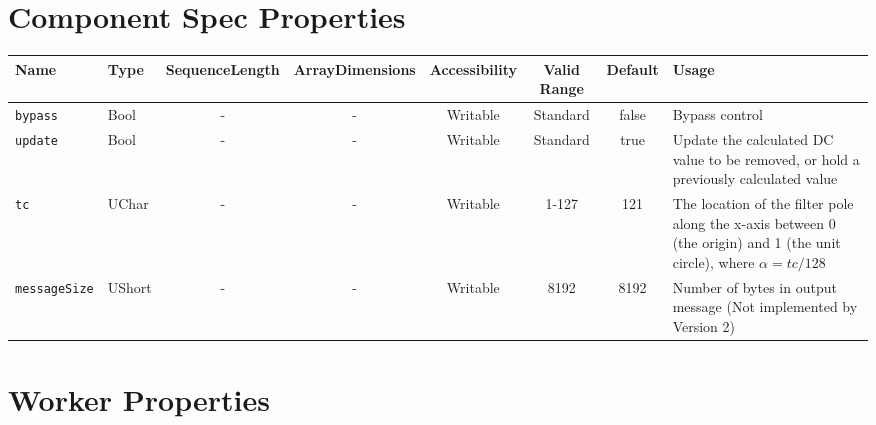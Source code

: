 \begin{landscape}
\section*{Component Spec Properties}
\begin{scriptsize}
	\begin{tabular}{|p{3cm}|p{1.5cm}|c|c|c|c|c|p{7cm}|}
		\hline
		\rowcolor{blue}
	Name               & Type   & SequenceLength & ArrayDimensions & Accessibility      & Valid Range & Default & Usage                                                                                                                    \\
		\hline
		\verb+bypass+      & Bool   & -              & -               &  Writable & Standard    & false   & Bypass control \\
		\hline
		\verb+update+      & Bool   & -              & -               & Writable & Standard    & true    & Update the calculated DC value to be removed, or hold a previously calculated value                                      \\
		\hline
		\verb+tc+          & UChar  & -              & -               & Writable & 1-127       & 121     & The location of the filter pole along the x-axis between 0 (the origin) and 1 (the unit circle), where $\alpha = tc/128$ \\
		\hline
		\verb+messageSize+ & UShort & -              & -               & Writable & 8192        & 8192    & Number of bytes in output  message (Not implemented by Version 2) \\
		\hline
	\end{tabular}
\end{scriptsize}

\section*{Worker Properties}

\end{landscape}
